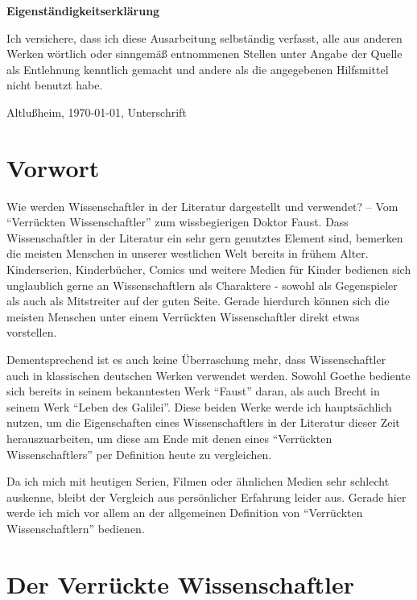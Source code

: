 \documentclass[12pt]{scrreprt}
\begin{document}
\makeititle
\begin{center}
	\sffamily\bfseries{Eigenständigkeitserklärung}
\end{center}
Ich versichere, dass ich diese Ausarbeitung selbständig verfasst, alle aus
anderen Werken wörtlich oder sinngemäß entnommenen Stellen unter Angabe der
Quelle als Entlehnung kenntlich gemacht und andere als die angegebenen
Hilfsmittel nicht benutzt habe.

Altlußheim, \today, Unterschrift
\tableofcontents
\listoftables

\chapter{Vorwort}
	\label{chap:vorwort}
Wie werden Wissenschaftler in der Literatur dargestellt und verwendet? – Vom \enquote{Verrückten Wissenschaftler} zum wissbegierigen Doktor Faust.
\smallskip\newline
Dass Wissenschaftler in der Literatur ein sehr gern genutztes Element sind, bemerken die meisten Menschen in unserer westlichen Welt bereits in frühem Alter. 
Kinderserien, Kinderbücher, Comics und weitere Medien für Kinder bedienen sich unglaublich gerne an Wissenschaftlern als Charaktere - sowohl als Gegenspieler als auch als Mitstreiter auf der guten Seite.
Gerade hierdurch können sich die meisten Menschen unter einem Verrückten Wissenschaftler direkt etwas vorstellen.

Dementsprechend ist es auch keine Überraschung mehr, dass Wissenschaftler auch in klassischen deutschen Werken verwendet werden.
Sowohl Goethe bediente sich bereits in seinem bekanntesten Werk \enquote{Faust} daran, als auch Brecht in seinem Werk \enquote{Leben des Galilei}.
Diese beiden Werke werde ich hauptsächlich nutzen, um die Eigenschaften eines Wissenschaftlers in der Literatur dieser Zeit herauszuarbeiten, um diese am Ende mit denen eines \enquote{Verrückten Wissenschaftlers} per Definition heute zu vergleichen.

Da ich mich mit heutigen Serien, Filmen oder ähnlichen Medien sehr schlecht auskenne, bleibt der Vergleich aus persönlicher Erfahrung leider aus.
Gerade hier werde ich mich vor allem an der allgemeinen Definition von \enquote{Verrückten Wissenschaftlern} bedienen.

\chapter{Der Verrückte Wissenschaftler}
	\label{chap:der verrückte Wissenschaftler}
\end{document}
